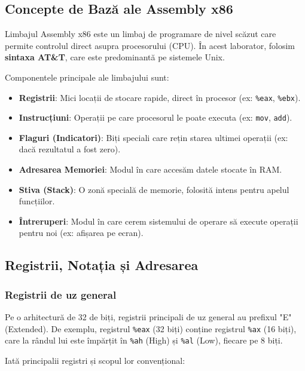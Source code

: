 \documentclass[12pt,a4paper]{article}
\begin{document}
\subsection{Concepte de Bază ale Assembly x86}

Limbajul Assembly x86 este un limbaj de programare de nivel scăzut care permite controlul direct asupra procesorului (CPU). În acest laborator, folosim \textbf{sintaxa AT\&T}, care este predominantă pe sistemele Unix.

Componentele principale ale limbajului sunt:
\begin{itemize}
    \item \textbf{Registrii}: Mici locații de stocare rapide, direct în procesor (ex: \texttt{\%eax}, \texttt{\%ebx}).
    \item \textbf{Instrucțiuni}: Operații pe care procesorul le poate executa (ex: \texttt{mov}, \texttt{add}).
    \item \textbf{Flaguri (Indicatori)}: Biți speciali care rețin starea ultimei operații (ex: dacă rezultatul a fost zero).
    \item \textbf{Adresarea Memoriei}: Modul în care accesăm datele stocate în RAM.
    \item \textbf{Stiva (Stack)}: O zonă specială de memorie, folosită intens pentru apelul funcțiilor.
    \item \textbf{Întreruperi}: Modul în care cerem sistemului de operare să execute operații pentru noi (ex: afișarea pe ecran).
\end{itemize}

\subsection{Registrii, Notația și Adresarea}

\subsubsection{Registrii de uz general}
Pe o arhitectură de 32 de biți, registrii principali de uz general au prefixul "E" (Extended). De exemplu, registrul \texttt{\%eax} (32 biți) conține registrul \texttt{\%ax} (16 biți), care la rândul lui este împărțit în \texttt{\%ah} (High) și \texttt{\%al} (Low), fiecare pe 8 biți.

Iată principalii registri și scopul lor convențional:
\end{document}
